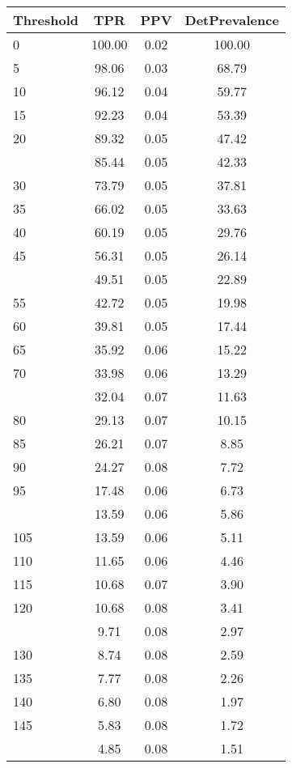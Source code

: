 \begin{table}[ht]
\centering
\begin{tabular}{lccc}
  \toprule
Threshold & TPR & PPV & DetPrevalence \\ 
  \midrule
0 & 100.00 & 0.02 & 100.00 \\ 
  5 & 98.06 & 0.03 & 68.79 \\ 
  10 & 96.12 & 0.04 & 59.77 \\ 
  15 & 92.23 & 0.04 & 53.39 \\ 
  20 & 89.32 & 0.05 & 47.42 \\ 
   \addlinespace
25 & 85.44 & 0.05 & 42.33 \\ 
  30 & 73.79 & 0.05 & 37.81 \\ 
  35 & 66.02 & 0.05 & 33.63 \\ 
  40 & 60.19 & 0.05 & 29.76 \\ 
  45 & 56.31 & 0.05 & 26.14 \\ 
   \addlinespace
50 & 49.51 & 0.05 & 22.89 \\ 
  55 & 42.72 & 0.05 & 19.98 \\ 
  60 & 39.81 & 0.05 & 17.44 \\ 
  65 & 35.92 & 0.06 & 15.22 \\ 
  70 & 33.98 & 0.06 & 13.29 \\ 
   \addlinespace
75 & 32.04 & 0.07 & 11.63 \\ 
  80 & 29.13 & 0.07 & 10.15 \\ 
  85 & 26.21 & 0.07 & 8.85 \\ 
  90 & 24.27 & 0.08 & 7.72 \\ 
  95 & 17.48 & 0.06 & 6.73 \\ 
   \addlinespace
100 & 13.59 & 0.06 & 5.86 \\ 
  105 & 13.59 & 0.06 & 5.11 \\ 
  110 & 11.65 & 0.06 & 4.46 \\ 
  115 & 10.68 & 0.07 & 3.90 \\ 
  120 & 10.68 & 0.08 & 3.41 \\ 
   \addlinespace
125 & 9.71 & 0.08 & 2.97 \\ 
  130 & 8.74 & 0.08 & 2.59 \\ 
  135 & 7.77 & 0.08 & 2.26 \\ 
  140 & 6.80 & 0.08 & 1.97 \\ 
  145 & 5.83 & 0.08 & 1.72 \\ 
   \addlinespace
150 & 4.85 & 0.08 & 1.51 \\ 

\end{tabular}
\end{table}
